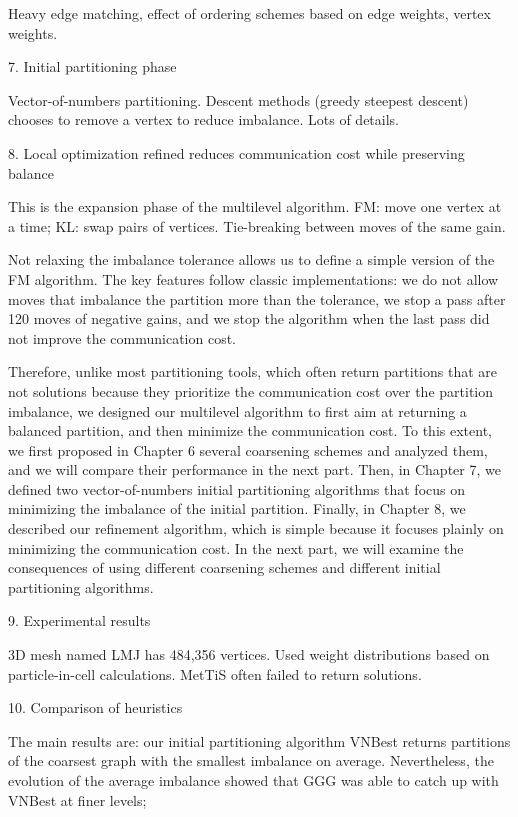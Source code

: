 \documentclass{article}
\begin{document}
Heavy edge matching, effect of ordering schemes based on edge weights, vertex weights.


7. Initial partitioning phase

Vector-of-numbers partitioning.
Descent methods (greedy steepest descent) chooses to remove a vertex to reduce imbalance.
Lots of details.


8. Local optimization refined reduces communication cost while preserving balance

This is the expansion phase of the multilevel algorithm.
FM: move one vertex at a time;
KL: swap pairs of vertices.
Tie-breaking between moves of the same gain.

Not relaxing the imbalance tolerance allows us to define a simple version of the FM algorithm. The key features follow classic implementations: we do not allow moves that imbalance the partition more than the tolerance, we stop a pass after 120 moves of negative gains, and we stop the algorithm when the last pass did not improve the communication cost. 

Therefore, unlike most partitioning tools, which often return partitions that are not solutions because they prioritize the communication cost over the partition imbalance, we designed our multilevel algorithm to first aim at returning a balanced partition, and then minimize the communication cost. To this extent, we first proposed in Chapter 6 several coarsening schemes and analyzed them, and we will compare their performance in the next part. Then, in Chapter 7, we defined two vector-of-numbers initial partitioning algorithms that focus on minimizing the imbalance of the initial partition. Finally, in Chapter 8, we described our refinement algorithm, which is simple because it focuses plainly on minimizing the communication cost. In the next part, we will examine the consequences of using different coarsening schemes and different initial partitioning algorithms. 

9. Experimental results

3D mesh named LMJ has 484,356 vertices.
Used weight distributions based on particle-in-cell calculations.
MetTiS often failed to return solutions.

10. Comparison of heuristics

The main results are: 
our initial partitioning algorithm VNBest returns partitions of the coarsest graph with the smallest imbalance on average. Nevertheless, the evolution of the average imbalance showed that GGG was able to catch up with VNBest at finer levels; 
\end{document}
